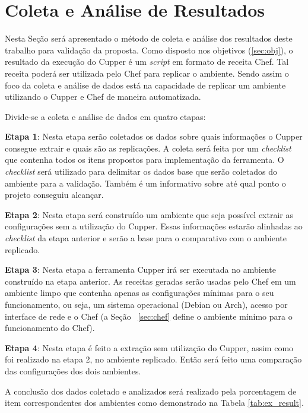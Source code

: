 \section{Coleta e Análise de Resultados}

Nesta Seção será apresentado o método de coleta e análise dos resultados deste %
trabalho para validação da proposta. Como disposto nos objetivos (\ref{sec:obj}),
o resultado da execução do Cupper é um \textit{script} em formato de receita Chef.
Tal receita poderá ser utilizada pelo Chef para replicar o ambiente. Sendo assim
o foco da coleta e análise de dados está na capacidade de replicar um ambiente
utilizando o Cupper e Chef de maneira automatizada.

Divide-se a coleta e análise de dados em quatro etapas:

\textbf{Etapa 1}: Nesta etapa serão coletados os dados sobre quais informações o Cupper consegue
extrair e quais são as replicações. A coleta será feita por um \textit{checklist} que contenha
todos os itens propostos para implementação da ferramenta. O \textit{checklist} será
utilizado para delimitar os dados base que serão coletados do ambiente para
a validação. Também é um informativo sobre até qual ponto o projeto conseguiu
alcançar.

\textbf{Etapa 2}: Nesta etapa será construído um ambiente que seja possível extrair as configurações
sem a utilização do Cupper. Essas informações estarão alinhadas ao \textit{checklist} da etapa
anterior e serão a base para o comparativo com o ambiente replicado.

\textbf{Etapa 3}: Nesta etapa a ferramenta Cupper irá ser executada no ambiente construído na etapa
anterior. As receitas geradas serão usadas pelo Chef em um ambiente limpo que contenha
apenas as configurações mínimas para o seu funcionamento, ou seja, um sistema
operacional (Debian ou Arch), acesso por interface de rede e o Chef (a Seção
~\ref{sec:chef} define o ambiente mínimo para o funcionamento do Chef).

\textbf{Etapa 4}: Nesta etapa é feito a extração sem utilização do Cupper, assim como foi realizado
na etapa 2, no ambiente replicado. Então será feito uma comparação das configurações
dos dois ambientes.

A conclusão dos dados coletado e analizados será realizado pela porcentagem de
item correspondentes dos ambientes como demonstrado na Tabela \ref{tab:ex_result}.


